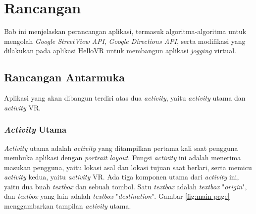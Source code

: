 \chapter{Rancangan}
\label{chap:rancangan}
Bab ini menjelaskan perancangan aplikasi, termasuk algoritma-algoritma untuk mengolah \textit{Google StreetView API}, \textit{Google Directions API}, serta modifikasi yang dilakukan pada aplikasi HelloVR untuk membangun aplikasi \textit{jogging} virtual. 

\section{Rancangan Antarmuka}
Aplikasi yang akan dibangun terdiri atas dua \textit{activity}, yaitu \textit{activity} utama dan \textit{activity} VR.

\subsection{\textit{Activity} Utama}
\label{subs:main-page}
\textit{Activity} utama adalah \textit{activity} yang ditampilkan pertama kali saat pengguna membuka aplikasi dengan \textit{portrait layout}. Fungsi \textit{activity} ini adalah menerima masukan pengguna, yaitu lokasi asal dan lokasi tujuan saat berlari, serta memicu \textit{activity} kedua, yaitu \textit{activity} VR. Ada tiga komponen utama dari \textit{activity} ini, yaitu dua buah \textit{textbox} dan sebuah tombol. Satu \textit{textbox} adalah \textit{textbox} "\textit{origin}", dan \textit{textbox} yang lain adalah \textit{textbox} "\textit{destination}". Gambar \ref{fig:main-page} menggambarkan tampilan \textit{activity} utama.  

